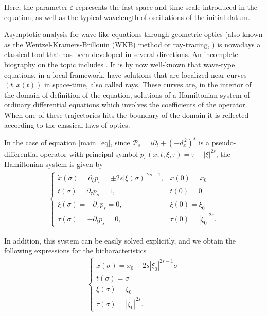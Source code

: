 \documentclass[10pt]{article}
\newcommand{\ffl}[2]{(-d_x^{\,2})^{#1}#2}
\newcommand{\PP}{\mathcal{P}}
\begin{document}
Here, the parameter $\varepsilon$ represents the fast space and time scale introduced in the equation, as well as the typical wavelength of oscillations of the initial datum. 

Asymptotic analysis for wave-like equations through geometric optics (also known as the Wentzel-Kramers-Brillouin (WKB) method or ray-tracing, \cite{brillouin1926mecanique,kramers1926wellenmechanik,spigler1997survey,wentzel1926verallgemeinerung}) is nowadays a classical tool that has been developed in several directions. An incomplete biography on the topic includes \cite{liu2010recovery,liu2013error,liu2015sobolev}. It is by now well-known that wave-type equations, in a local framework, have solutions that are localized near curves $(t,x(t))$ in space-time, also called rays. These curves are, in the interior of the domain of definition of the equation, solutions of a Hamiltonian system of ordinary differential equations which involves the coefficients of the operator. When one of these trajectories hits the boundary of the domain it is reflected according to the classical laws of optics.

In the case of equation \eqref{main_eq}, since $\PP_s=i\partial_t+\ffl{s}{}$ is a pseudo-differential operator with principal symbol $p_s(x,t,\xi,\tau) = \tau - |\xi|^{2s}$, the Hamiltonian system is given by
\begin{align*}
	\begin{cases}
		\dot{x}(\sigma) = \partial_\xi p_s = \pm 2s|\xi(\sigma)|^{2s-1}, & x(0)=x_0
		\\
		\dot{t}(\sigma) = \partial_\tau p_s = 1, & t(0)=0
		\\
		\dot{\xi}(\sigma) = -\partial_x p_s = 0, & \xi(0)=\xi_0
		\\
		\dot{\tau}(\sigma) = -\partial_t p_s =0, & \tau(0)=|\xi_0|^{2s}.
	\end{cases}
\end{align*}

In addition, this system can be easily solved explicitly, and we obtain the following expressions for the bicharacteristics
\begin{align*}
	\begin{cases}
		x(\sigma) = x_0 \pm 2s|\xi_0|^{2s-1}\sigma
		\\
		t(\sigma) = \sigma 
		\\
		\xi(\sigma) = \xi_0
		\\
		\tau(\sigma) = |\xi_0|^{2s}.
	\end{cases}
\end{align*}
\end{document}
